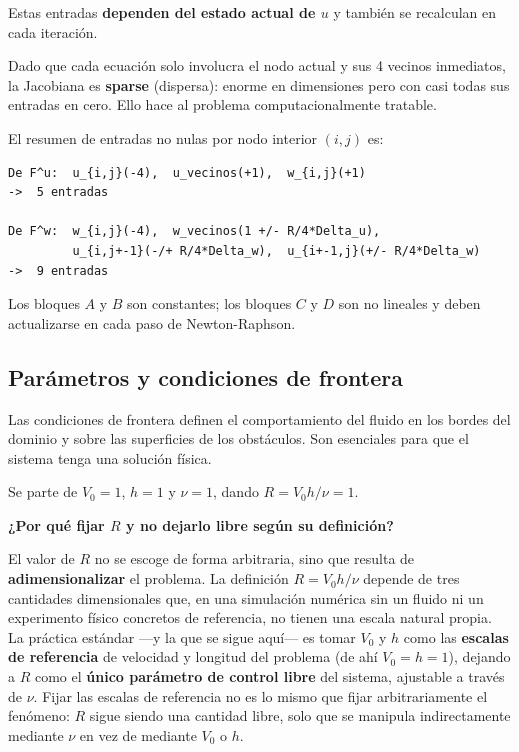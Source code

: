 \documentclass[12pt, a4paper]{article}
\begin{document}
Estas entradas \textbf{dependen del estado actual de $u$} y también se
recalculan en cada iteración.

\bigskip

Dado que cada ecuación solo involucra el nodo actual y sus 4 vecinos inmediatos,
la Jacobiana es \textbf{sparse} (dispersa): enorme en dimensiones pero con casi
todas sus entradas en cero. Ello hace al problema computacionalmente tratable.

El resumen de entradas no nulas por nodo interior $(i,j)$ es:

\begin{lstlisting}
De F^u:  u_{i,j}(-4),  u_vecinos(+1),  w_{i,j}(+1)          
->  5 entradas

De F^w:  w_{i,j}(-4),  w_vecinos(1 +/- R/4*Delta_u),
         u_{i,j+-1}(-/+ R/4*Delta_w),  u_{i+-1,j}(+/- R/4*Delta_w)
->  9 entradas
\end{lstlisting}

Los bloques $A$ y $B$ son constantes; los bloques $C$ y $D$ son no lineales
y deben actualizarse en cada paso de Newton-Raphson.

\subsection{Parámetros y condiciones de frontera}

Las condiciones de frontera definen el comportamiento del fluido en los bordes
del dominio y sobre las superficies de los obstáculos. Son esenciales para que
el sistema tenga una solución física.

Se parte de $V_{0} = 1$, $h = 1$ y $\nu = 1$, dando $R = V_{0}h/\nu = 1$.

\bigskip
\noindent\textbf{¿Por qué fijar $R$ y no dejarlo libre según su definición?}

El valor de $R$ no se escoge de forma arbitraria, sino que resulta de
\textbf{adimensionalizar} el problema. La definición $R = V_0 h/\nu$
depende de tres cantidades dimensionales que, en una simulación numérica sin
un fluido ni un experimento físico concretos de referencia, no tienen una
escala natural propia. La práctica estándar —y la que se sigue aquí— es
tomar $V_0$ y $h$ como las \textbf{escalas de referencia} de velocidad y
longitud del problema (de ahí $V_0 = h = 1$), dejando a $R$ como el
\textbf{único parámetro de control libre} del sistema, ajustable a través
de $\nu$. Fijar las escalas de referencia no es lo mismo que fijar
arbitrariamente el fenómeno: $R$ sigue siendo una cantidad libre, solo que
se manipula indirectamente mediante $\nu$ en vez de mediante $V_0$ o $h$.
\end{document}
